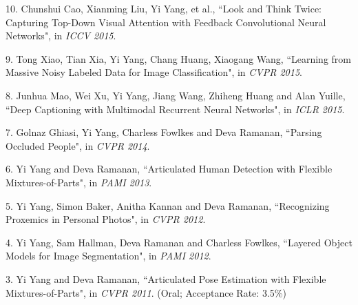 \documentclass[margin]{res3}
\newenvironment{list1}{
  \begin{list}{\ding{113}}{%
      \setlength{\itemsep}{0.03in}
      \setlength{\parsep}{0in} \setlength{\parskip}{0in}
      \setlength{\topsep}{0in} \setlength{\partopsep}{0in}
      \setlength{\leftmargin}{0in}}}{\end{list}}
\begin{document}
\begin{resume}
\begin{list1}
\item[] 10. Chunshui Cao, Xianming Liu, Yi Yang, et al.,
``Look and Think Twice: Capturing Top-Down Visual Attention with Feedback Convolutional Neural Networks",
in \textit{ICCV 2015}.

\item[] 9. Tong Xiao, Tian Xia, Yi Yang, Chang Huang, Xiaogang Wang,
``Learning from Massive Noisy Labeled Data for Image Classification",
in \textit{CVPR 2015}.

\item[] 8. Junhua Mao, Wei Xu, Yi Yang, Jiang Wang, Zhiheng Huang and Alan Yuille,
``Deep Captioning with Multimodal Recurrent Neural Networks",
in \textit{ICLR 2015}.

\item[] 7. Golnaz Ghiasi, Yi Yang, Charless Fowlkes and Deva Ramanan,
``Parsing Occluded People",
in \textit{CVPR 2014}.

\item[] 6. Yi Yang and Deva Ramanan,
``Articulated Human Detection with Flexible Mixtures-of-Parts",
in \textit{PAMI 2013}.

\item[] 5. Yi Yang, Simon Baker, Anitha Kannan and Deva Ramanan,
``Recognizing Proxemics in Personal Photos",
in \textit{CVPR 2012}.

\item[] 4. Yi Yang, Sam Hallman, Deva Ramanan and Charless Fowlkes,
``Layered Object Models for Image Segmentation",
in \textit{PAMI 2012}.

\item[] 3. Yi Yang and Deva Ramanan,
``Articulated Pose Estimation with Flexible Mixtures-of-Parts",
in \textit{CVPR 2011}. (Oral; Acceptance Rate: 3.5\%)


\end{list1}
\end{resume}
\end{document}
